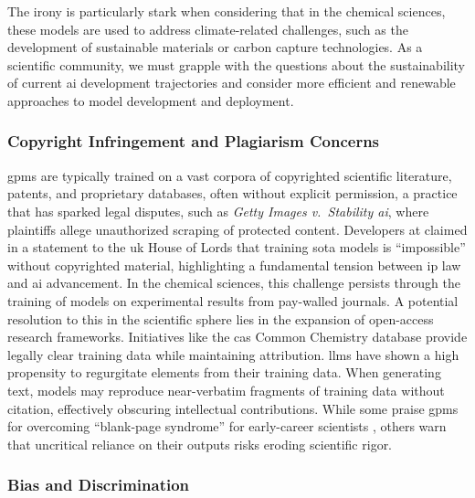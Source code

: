 The irony is particularly stark when considering that in the chemical sciences, these models are used to address climate-related challenges, such as the development of sustainable materials or carbon capture technologies. 
As a scientific community, we must grapple with the questions about the sustainability of current \gls{ai} development trajectories and consider more efficient and renewable approaches to model development and deployment. \autocite{kolbert2024obscene}


\subsubsection{Copyright Infringement and Plagiarism Concerns}

\glspl{gpm} are typically trained on a vast corpora of copyrighted scientific literature, patents, and proprietary databases, often without explicit permission, a practice that has sparked legal disputes, such as \textit{Getty Images v.\ Stability \gls{ai}}, where plaintiffs allege unauthorized scraping of protected content. \autocite{kirchhubel2024intellectual} Developers at  claimed in a statement to the \gls{uk} House of Lords that training \gls{sota} models is \enquote{impossible} without copyrighted material, highlighting a fundamental tension between \gls{ip} law and \gls{ai} advancement. \autocite{openai2023written} 
In the chemical sciences, this challenge persists through the training of models on experimental results from pay-walled journals. 
A potential resolution to this in the scientific sphere lies in the expansion of open-access research frameworks. 
Initiatives like the \gls{cas} Common Chemistry database provide legally clear training data while maintaining attribution.
\glspl{llm} have shown a high propensity to regurgitate elements from their training data. 
When generating text, models may reproduce near-verbatim fragments of training data without citation, effectively obscuring intellectual contributions.\autocite{bender2021dangers} 
While some praise \glspl{gpm} for overcoming \enquote{blank-page syndrome} for early-career scientists \autocite{altmae2023artificial}, others warn that uncritical reliance on their outputs risks eroding scientific rigor.\autocite{donker2023dangers}


\subsubsection{Bias and Discrimination}

